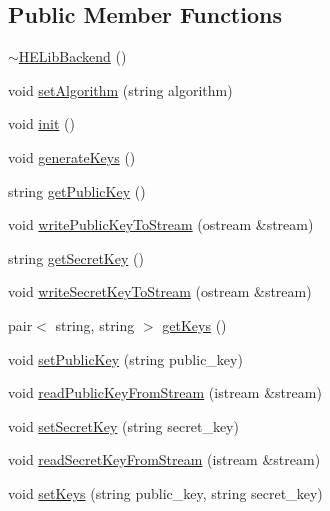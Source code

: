 \subsection*{Public Member Functions}
\begin{DoxyCompactItemize}
\item 
\hyperlink{classhomomorphine_1_1_h_e_lib_backend_a1ef98efe05281fefbe6d044dc474017a}{$\sim$\+H\+E\+Lib\+Backend} ()
\item 
void \hyperlink{classhomomorphine_1_1_h_e_lib_backend_a39478377b0e299fd90f5c7bb6c8efe89}{set\+Algorithm} (string algorithm)
\item 
void \hyperlink{classhomomorphine_1_1_h_e_lib_backend_a6a7e7c8095f2287c41f7d93be91418ec}{init} ()
\item 
void \hyperlink{classhomomorphine_1_1_h_e_lib_backend_a2c6ed82eeb597b99ae6cdb2734412a0f}{generate\+Keys} ()
\item 
string \hyperlink{classhomomorphine_1_1_h_e_lib_backend_a8b096d4780f3b65f0fa0cb3ca6cb9ab8}{get\+Public\+Key} ()
\item 
void \hyperlink{classhomomorphine_1_1_h_e_lib_backend_acd7a366e43b8408d370424f136fc9f21}{write\+Public\+Key\+To\+Stream} (ostream \&stream)
\item 
string \hyperlink{classhomomorphine_1_1_h_e_lib_backend_a57af39a901a44fef6aad76503739fde4}{get\+Secret\+Key} ()
\item 
void \hyperlink{classhomomorphine_1_1_h_e_lib_backend_ac20314b484b23a46ff2070445576f413}{write\+Secret\+Key\+To\+Stream} (ostream \&stream)
\item 
pair$<$ string, string $>$ \hyperlink{classhomomorphine_1_1_h_e_lib_backend_ab45838cc01a4e71425e2aa0279e12c0e}{get\+Keys} ()
\item 
void \hyperlink{classhomomorphine_1_1_h_e_lib_backend_af54dc3990d99aab69c97172d0e5b4e51}{set\+Public\+Key} (string public\+\_\+key)
\item 
void \hyperlink{classhomomorphine_1_1_h_e_lib_backend_a2b9f132cc4dde870db1e69553349813b}{read\+Public\+Key\+From\+Stream} (istream \&stream)
\item 
void \hyperlink{classhomomorphine_1_1_h_e_lib_backend_a483a6695be2d733d48e2180ffb25d053}{set\+Secret\+Key} (string secret\+\_\+key)
\item 
void \hyperlink{classhomomorphine_1_1_h_e_lib_backend_ad1ed1336d11c5b75419efa58aa9071e3}{read\+Secret\+Key\+From\+Stream} (istream \&stream)
\item 
void \hyperlink{classhomomorphine_1_1_h_e_lib_backend_a2980c8eaf3556057aac364a1e61ab8cd}{set\+Keys} (string public\+\_\+key, string secret\+\_\+key)

\end{DoxyCompactItemize}
